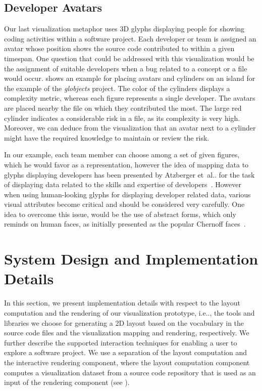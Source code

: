 \documentclass[runningheads]{llncs}
\makeatletter
\DeclareRobustCommand\onedot{\futurelet\@let@token\@onedot}
\def\@onedot{\ifx\@let@token.\else.\null\fi\xspace}
\def\etal{et~al\onedot}
\def\ie{i.e\onedot,\xspace}
\makeatother
\begin{document}
\subsection{Developer Avatars}
Our last visualization metaphor uses 3D glyphs displaying people for showing coding activities within a software project.
Each developer or team is assigned an avatar whose position shows the source code contributed to within a given timespan.
One question that could be addressed with this visualization would be the assignment of suitable developers when a bug related to a concept or a file would occur.
 shows an example for placing avatars and cylinders on an island for the example of the \textit{globjects} project.
The color of the cylinders displays a complexity metric, whereas each figure represents a single developer.
The avatars are placed nearby the file on which they contributed the most.
The large red cylinder indicates a considerable risk in a file, as its complexity is very high.
Moreover, we can deduce from the visualization that an avatar next to a cylinder might have the required knowledge to maintain or review the risk.

In our example, each team member can choose among a set of given figures, which he would favor as a representation, however the idea of mapping data to glyphs displaying developers has been presented by Atzberger \etal for the task of displaying data related to the skills and expertise of developers~\cite{atzberger2022-knowhowmap}.
However when using human-looking glyphs for displaying developer related data, various visual attributes become critical and should be considered very carefully.
One idea to overcome this issue, would be the use of abstract forms, which only reminds on human faces, as initially presented as the popular Chernoff faces~\cite{chernoff1973use}.

\section{System Design and Implementation Details}
\label{sec:implementation}
In this section, we present implementation details with respect to the layout computation and the rendering of our visualization prototype, \ie the tools and libraries we choose for generating a 2D layout based on the vocabulary in the source code files and the visualization mapping and rendering, respectively.
We further describe the supported interaction techniques for enabling a user to explore a software project.
We use a separation of the layout computation and the interactive rendering component, where the layout computation component computes a visualization dataset from a source code repository that is used as an input of the rendering component (see ).
\end{document}
